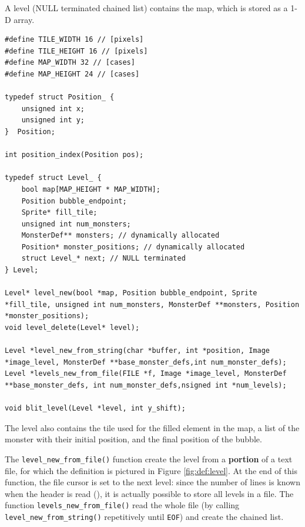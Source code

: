\documentclass[12pt,a4paper]{article}
\newcommand{\cc}[1]{\texttt{#1}}
\begin{document}
A level (NULL terminated chained list) contains the map, which is stored as a 1-D array.

\begin{verbatim}
#define TILE_WIDTH 16 // [pixels]
#define TILE_HEIGHT 16 // [pixels]
#define MAP_WIDTH 32 // [cases]
#define MAP_HEIGHT 24 // [cases]

typedef struct Position_ {
    unsigned int x;
    unsigned int y;
}  Position;

int position_index(Position pos);

typedef struct Level_ {
    bool map[MAP_HEIGHT * MAP_WIDTH];
    Position bubble_endpoint;
    Sprite* fill_tile;
    unsigned int num_monsters;
    MonsterDef** monsters; // dynamically allocated
    Position* monster_positions; // dynamically allocated
    struct Level_* next; // NULL terminated
} Level;

Level* level_new(bool *map, Position bubble_endpoint, Sprite *fill_tile, unsigned int num_monsters, MonsterDef **monsters, Position *monster_positions);
void level_delete(Level* level);

Level *level_new_from_string(char *buffer, int *position, Image *image_level, MonsterDef **base_monster_defs,int num_monster_defs);
Level *levels_new_from_file(FILE *f, Image *image_level, MonsterDef **base_monster_defs, int num_monster_defs,nsigned int *num_levels);

void blit_level(Level *level, int y_shift);
\end{verbatim} 

The level also contains the tile used for the filled element in the map, a list of the monster with their initial position, and the final position of the bubble.

The \cc{level_new_from_file()} function create the level from a \textbf{portion} of a text file, for which the definition is pictured in Figure \ref{fig:def:level}. At the end of this function, the file cursor is set to the next level: since the number of lines is known when the header is read (\text{1 + \cc{num_monster} + 24}), it is actually possible to store all levels in a file. The function \cc{levels_new_from_file()} read the whole file (by calling \cc{level_new_from_string()} repetitively until \cc{EOF}) and create the chained list. 
\end{document}

